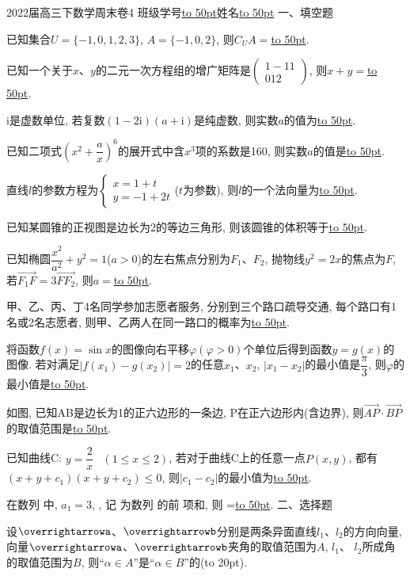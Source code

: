 \documentclass[10pt,a4paper]{article}
\newcommand{\blank}[1]{\underline{\hbox to #1pt{}}}
\newcommand{\bracket}[1]{(\hbox to #1pt{})}
\begin{document}
2022届高三下数学周末卷4   班级学号\blank{50}姓名\blank{50}
一、填空题
\item 已知集合$U=\{-1,0,1,2,3\}$, $A=\{-1,0,2\}$, 则$C_UA=$\blank{50}.
\item 已知一个关于$x$、$y$的二元一次方程组的增广矩阵是$\begin{pmatrix}
   1  -1  1  \\0  1  2  \end{pmatrix}$, 则$x+y=$\blank{50}.
\item $\mathrm{i}$是虚数单位, 若复数$(1-2\mathrm{i})(a+\mathrm{i})$是纯虚数, 则实数$a$的值为\blank{50}.
\item 已知二项式$(x^2+\dfrac ax)^6$的展开式中含$x^3$项的系数是160, 则实数$a$的值是\blank{50}.
\item 直线$l$的参数方程为$\begin{cases} x=1+t \\ y=-1+2t \end{cases}$($t$为参数), 则$l$的一个法向量为\blank{50}.
\item 已知某圆锥的正视图是边长为2的等边三角形, 则该圆锥的体积等于\blank{50}.
\item 已知椭圆$\dfrac{x^2}{a^2}+y^2=1$($a>0$)的左右焦点分别为$F_1$、$F_2$, 抛物线$y^2=2x$的焦点为$F$, 若$\overrightarrow{F_1F}=3\overrightarrow{FF_2}$, 则$a=$\blank{50}.
\item 甲、乙、丙、丁4名同学参加志愿者服务, 分别到三个路口疏导交通, 每个路口有1名或2名志愿者, 则甲、乙两人在同一路口的概率为\blank{50}.
\item 将函数$f(x)=\sin x$的图像向右平移$\varphi (\varphi >0)$个单位后得到函数$y=g(x)$的图像. 若对满足$|f(x_1)-g(x_2)|=2$的任意$x_1$、$x_2$, $|x_1-x_2|$的最小值是$\dfrac{\pi }3$, 则$\varphi$的最小值是\blank{50}.
\item 如图, 已知AB是边长为1的正六边形的一条边,
P在正六边形内(含边界), 则$\overrightarrow{AP}\cdot \overrightarrow{BP}$的取值范围是\blank{50}.
\item 已知曲线C: $y=\dfrac 2x\begin{matrix}
     \end{matrix}(1\le x\le 2)$, 若对于曲线C上的任意一点$P(x,y)$, 都有$(x+y+c_1)(x+y+c_2)\le 0$, 则$|c_1-c_2|$的最小值为\blank{50}.
\item 在数列 中, $a_1=3$, , 记 为数列 的前 项和, 则 =\blank{50}.
二、选择题
\item 设$\overrightarrowa$、$\overrightarrowb$分别是两条异面直线$l_1$、$l_2$的方向向量, 向量$\overrightarrowa$、$\overrightarrowb$夹角的取值范围为$A$, $l_1$、
$l_2$所成角的取值范围为$B$, 则``$\alpha \in A$''是``$\alpha \in B$''的\bracket{20}.
\end{document}
